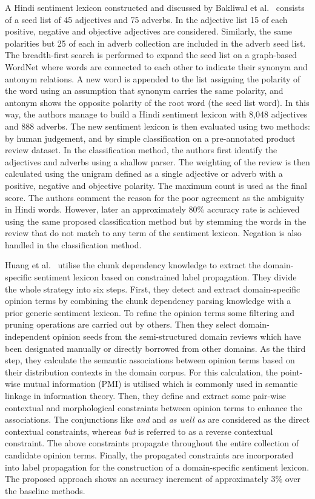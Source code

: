 A Hindi sentiment lexicon constructed and discussed
by Bakliwal et al.~\cite{BAV12} consists
of a seed list of 45 adjectives and 75 adverbs.
In the adjective list 15 of each positive, negative
and objective adjectives are considered.
Similarly, the same polarities but 25 of each in adverb collection are included
in the adverb seed list.
The breadth-first search is performed to expand the seed list
on a graph-based WordNet where words are connected to each other
to indicate their synonym and antonym relations.
A new word is appended to the list assigning the polarity of the word
using an assumption that synonym carries the same polarity,
and antonym shows the opposite polarity of the root word (the seed list word).
In this way, the authors manage to build a Hindi sentiment lexicon
with 8,048 adjectives and 888 adverbs.
The new sentiment lexicon is then evaluated using two methods:
by human judgement,
and by simple classification on a pre-annotated product review dataset.
In the classification method,
the authors first identify the adjectives and adverbs using a shallow parser.
The weighting of the review is then calculated using the unigram
defined as a single adjective or adverb
with a positive, negative and objective polarity.
The maximum count is used as the final score.
The authors comment the reason for the poor agreement as the ambiguity in Hindi words.
However, later an approximately 80\% accuracy rate is achieved
using the same proposed classification method
but by stemming the words in the review
that do not match to any term of the sentiment lexicon.
Negation is also handled in the classification method.

Huang et al.~\cite{HNS14} utilise the chunk dependency knowledge
to extract the domain-specific sentiment lexicon based on constrained label propagation. They divide the whole strategy into six steps.
First, they detect and extract domain-specific opinion terms
by combining the chunk dependency parsing knowledge
with a prior generic sentiment lexicon.
To refine the opinion terms
some filtering and pruning operations are carried out by others.
Then they select domain-independent opinion seeds
from the semi-structured domain reviews which have been designated manually
or directly borrowed from other domains.
As the third step, they calculate the semantic associations between opinion terms
based on their distribution contexts in the domain corpus.
For this calculation, the point-wise mutual information (PMI) is utilised
which is commonly used in semantic linkage in information theory.
Then, they define and extract some pair-wise contextual and morphological constraints
between opinion terms to enhance the associations.
The conjunctions like \emph{and} and \emph{as well as} are considered
as the direct contextual constraints, whereas \emph{but} is referred to
as a reverse contextual constraint.
The above constraints propagate throughout the entire collection
of candidate opinion terms.
Finally, the propagated constraints are incorporated into label propagation
for the construction of a domain-specific sentiment lexicon.
The proposed approach shows an accuracy increment
of approximately 3\% over the baseline methods.


